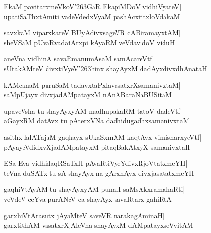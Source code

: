 \documentclass[twoside,12pt,openright]{book}
\def\S{\char'263}
\newcounter{shloka}[chapter]
\begin{document}
\begin{shloka}%
EkaM pavitarxmeVkoV\S GaR EkapiMDoV vidhiVyateV|\\
upatiSaThxtAmiti vadeVdedxVyaM pashAcxtitxloVdakaM 
\end{shloka}

\begin{shloka}%
savxkaM viparxkareV BUyAdivxsageVR cABiramayxtAM|\\
sheVSaM pUvaRvadatArxpi kAyaRM veVdavidoV viduH
\end{shloka}

\begin{shloka}%
aneVna vidhinA savaRmanumAsaM samAcareVtf|\\
sUtakAMteV divxtiVyeV\S hinx shayAyxM dadAyxdivxdhAnataH
\end{shloka}

\begin{shloka}%
kAMcanaM puruSaM tadavxtaPxlavasatxrXsamanivxtaM|\\
saMpUjayx divxjadAMpatayxM nAnABaraNaBUSitaM
\end{shloka}

\begin{shloka}%
upaveVsha tu shayAyxyAM madhupakaRM tatoV dadeVtf|\\
aGayxRM datAvx tu pAterxVNa dadhidugadhxsamanivxtaM
\end{shloka}

\begin{shloka}%
asithx lalATajaM gaqhayx sUkaSxmXM kaqtAvx vimisharxyeVtf|\\
pAyayeVdidxvXjadAMpatayxM pitaqBakAtxyX samanivxtaH
\end{shloka}

\begin{shloka}%
ESa Eva vidhidaqRSaTxH pAvaRtiVyeYdivxRjoVtatxmeYH|\\
teVna duSATx tu sA shayAyx na gArxhAyx divxjasatatxmeYH
\end{shloka}

\begin{shloka}%
gaqhiVtAyAM tu shayAyxyAM punaH saMsAkxramahaRti|\\
veVdeV ceYva purANeV ca shayAyx savaRtarx gahiRtA
\end{shloka}

\begin{shloka}%
garxhiVtArasutx jAyaMteV saveVR narakagAminaH|\\
garxtithAM vasatxrXjAleVna shayAyxM dAMpatayxseVvitAM
\end{shloka}
\end{document}
